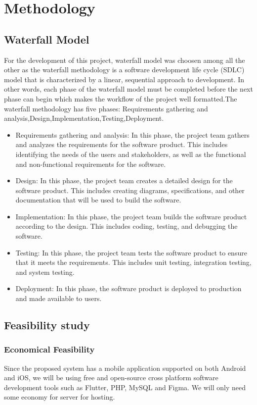 \documentclass{article}
\begin{document}
\section{Methodology}
\subsection{Waterfall Model}
For the development of this project, waterfall model was choosen among all the other as the waterfall methodology is a software development life cycle (SDLC) model that is characterized by a linear, sequential approach to development. In other words, each phase of the waterfall model must be completed before the next phase can begin which makes the workflow of the project well formatted.The waterfall methodology has five phases:
Requirements gathering and analysis,Design,Implementation,Testing,Deployment.\\
\begin{itemize}
    \item Requirements gathering and analysis: In this phase, the project team gathers and analyzes the requirements for the software product. This includes identifying the needs of the users and stakeholders, as well as the functional and non-functional requirements for the software.
    \item Design: In this phase, the project team creates a detailed design for the software product. This includes creating diagrams, specifications, and other documentation that will be used to build the software.
    \item Implementation: In this phase, the project team builds the software product according to the design. This includes coding, testing, and debugging the software.
    \item Testing: In this phase, the project team tests the software product to ensure that it meets the requirements. This includes unit testing, integration testing, and system testing.
    \item Deployment: In this phase, the software product is deployed to production and made available to users.
\end{itemize}

\subsection{Feasibility study}
\subsubsection{Economical Feasibility}
Since the proposed system has a mobile application supported
on both Android and iOS, we will be using free and open-source cross platform
software development tools such as Flutter, PHP, MySQL and Figma. We will only need some economy for server for hosting.
\end{document}
